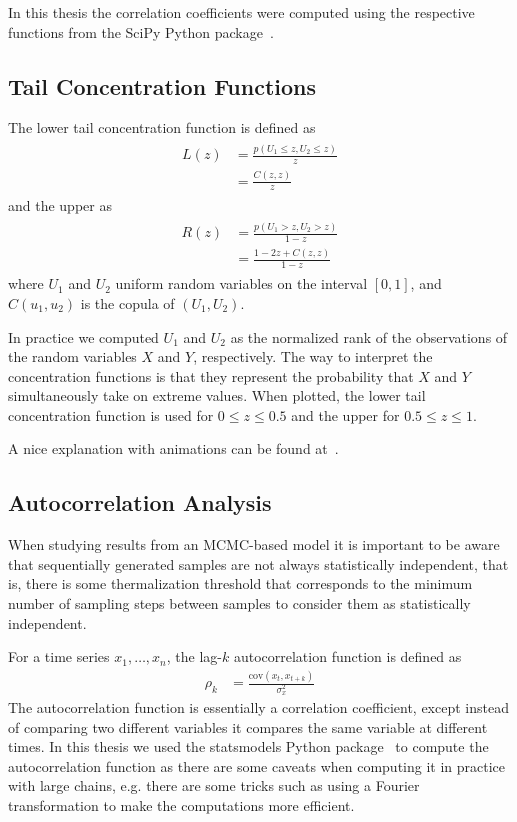 In this thesis the correlation coefficients were computed using the respective functions from the SciPy Python package~\cite{python_scipy}.

\subsection{Tail Concentration Functions}\label{app:tail_concentration_functions}
The lower tail concentration function is defined as~\cite{venter_2002}
\begin{align}
\begin{split}
    L(z)
        &= \frac{p(U_1 \le z, U_2 \le z)}{z} \\
        &= \frac{C(z,z)}{z}
\end{split}
\end{align}
and the upper as
\begin{align}
\begin{split}
    R(z)
        &= \frac{p(U_1 > z, U_2 > z)}{1-z} \\
        &= \frac{1 - 2z + C(z,z)}{1-z}
\end{split}
\end{align}
where \( U_1 \) and \( U_2 \) uniform random variables on the interval \( [0, 1] \), and \( C(u_1, u_2) \) is the copula of \( (U_1, U_2) \).

In practice we computed \( U_1 \) and \( U_2 \) as the normalized rank of the observations of the random variables \( X \) and \( Y \), respectively.
The way to interpret the concentration functions is that they represent the probability that \( X \) and \( Y \) simultaneously take on extreme values.
When plotted, the lower tail concentration function is used for \( 0 \le z \le 0.5 \) and the upper for \( 0.5 \le z \le 1 \).

A nice explanation with animations can be found at~\cite{charpentier_2012}.

\subsection{Autocorrelation Analysis}\label{app:autocorrelation_analysis}
When studying results from an MCMC-based model it is important to be aware that sequentially generated samples are not always statistically independent, that is, there is some thermalization threshold that corresponds to the minimum number of sampling steps between samples to consider them as statistically independent.

For a time series \( x_1, \dots, x_n \), the lag-\( k \) autocorrelation function is defined as~\cite{time_series_analysis}
\begin{align}
    \rho_k
        &= \frac{\text{cov}(x_t, x_{t+k})}{\sigma_{x}^2}
\end{align}
The autocorrelation function is essentially a correlation coefficient, except instead of comparing two different variables it compares the same variable at different times.
In this thesis we used the statsmodels Python package~\cite{python_statsmodels} to compute the autocorrelation function as there are some caveats when computing it in practice with large chains, e.g. there are some tricks such as using a Fourier transformation to make the computations more efficient.


